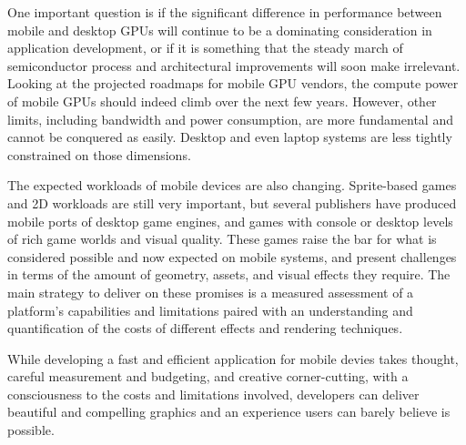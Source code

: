 One important question is if the significant difference in performance
between
 mobile and desktop GPUs will continue to be a dominating
consideration in application development, or if
 it is something that the
steady march of semiconductor process and
 architectural improvements will
soon make irrelevant.  Looking at the projected
 roadmaps for mobile GPU
vendors, the compute power of mobile GPUs should indeed
 climb over the next
few years.  However, other limits, including bandwidth and
 power consumption,
are more fundamental and cannot be conquered as easily.  Desktop and even
laptop systems are less tightly constrained on those dimensions.

The expected workloads of mobile devices are also changing.  Sprite-based games
and 2D workloads are still very important, but several publishers have
produced mobile ports of desktop game engines, and games with console or
desktop levels of rich game worlds and visual quality.  These games raise the
bar for what is considered possible and now expected on mobile systems, and
present challenges in terms of the amount of geometry, assets, and visual
effects they require.  The main strategy to deliver on these promises is a
measured assessment of a platform's capabilities and limitations paired with an
understanding and quantification of the costs of different effects and
rendering techniques.  

While developing a fast and efficient application for mobile devies takes
thought, careful measurement and budgeting, and creative corner-cutting, with a
consciousness to the costs and limitations involved, developers can deliver
beautiful and compelling graphics and an experience users can barely believe is
possible.

 











